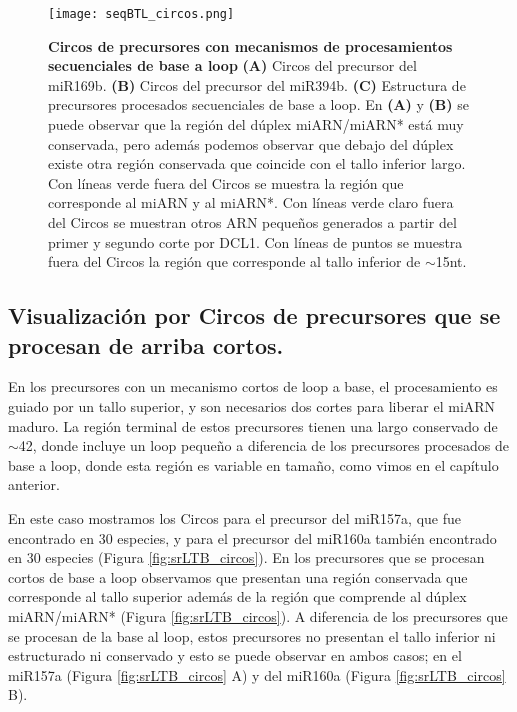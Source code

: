 \begin{landscape}
    \begin{figure}[htbp!] 
        \centering    
        \texttt{[image: seqBTL\_circos.png]}
        \caption[Circos de precursores con mecanismos de procesamientos secuenciales de base a loop]{
        \textbf{Circos de precursores con mecanismos de procesamientos secuenciales de base a loop}
		 \textbf{(A)} Circos del precursor del miR169b.
		 \textbf{(B)} Circos del precursor del miR394b.
		 \textbf{(C)} Estructura de precursores procesados secuenciales de base a loop.
		 En \textbf{(A)} y \textbf{(B)} se puede observar que la región del dúplex miARN/miARN* está muy conservada, pero además podemos observar que debajo del dúplex existe otra región conservada que coincide con el tallo inferior largo.
        Con líneas verde fuera del Circos se muestra la región que corresponde al miARN y al miARN*. 
        Con líneas verde claro fuera del Circos se muestran otros ARN pequeños  generados a partir del primer y segundo corte por DCL1.
        Con líneas de puntos se muestra fuera del Circos la región que corresponde al tallo inferior de $\sim$15nt.
		}
         \label{fig:seqBTL_circos}
    \end{figure}
\end{landscape}


\subsection{Visualización por Circos de precursores que se procesan de arriba cortos.}

En los precursores con un mecanismo cortos de loop a base, el procesamiento es guiado por un tallo superior, y son necesarios dos cortes para liberar el miARN maduro.
La región terminal de estos precursores tienen una largo conservado de $\sim$42, donde incluye un loop pequeño \citep{Bologna2013} a diferencia de los precursores procesados de base a loop, donde esta región es variable en tamaño, como vimos en el capítulo anterior.

En este caso mostramos los Circos para el precursor del miR157a, que fue encontrado en 30 especies, y para el precursor del miR160a también encontrado en 30 especies (Figura \ref{fig:srLTB_circos}). 
En los precursores que se procesan cortos de base a loop observamos que presentan una región conservada que corresponde al tallo superior además de la región que comprende al dúplex miARN/miARN* (Figura \ref{fig:srLTB_circos}).
A diferencia de los precursores que se procesan de la base al loop, estos precursores no presentan el tallo inferior ni estructurado ni conservado y esto se puede observar en ambos casos; en el miR157a (Figura \ref{fig:srLTB_circos} A) y del miR160a (Figura \ref{fig:srLTB_circos} B).


